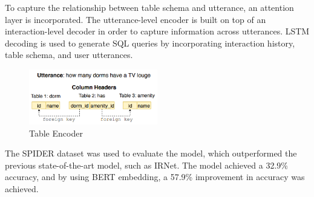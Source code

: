To capture the relationship between table schema and utterance, an attention layer is incorporated.
The utterance-level encoder is built on top of an interaction-level decoder in order to capture information across utterances.
LSTM decoding is used to generate SQL queries by incorporating interaction history, table schema, and user utterances.

\begin{figure}[H]
    \centering
    \includegraphics[width=0.5\textwidth]{pics/EditSQL/example.png}
    \caption{Table Encoder \cite{DBLP:journals/corr/abs-1909-00786}}
    \label{fig:EditSQL_example}
\end{figure}

The SPIDER dataset was used to evaluate the model, which outperformed the previous state-of-the-art model, such as IRNet. The model achieved a 32.9\% accuracy, and by using BERT embedding, a 57.9\% improvement in accuracy was achieved.